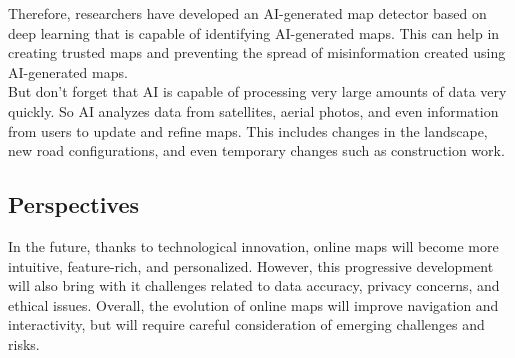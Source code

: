 \documentclass[10pt,oneside,english,a4paper]{article}
\begin{document}
Therefore, researchers have developed an AI-generated map detector based on deep learning that is capable of identifying AI-generated maps. This can help in creating trusted maps and preventing the spread of misinformation created using AI-generated maps.
\\But don't forget that AI is capable of processing very large amounts of data very quickly. So AI analyzes data from satellites, aerial photos, and even information from users to update and refine maps. This includes changes in the landscape, new road configurations, and even temporary changes such as construction work.

\subsection{Perspectives} \label{future:perspectives}
In the future, thanks to technological innovation, online maps will become more intuitive, feature-rich, and personalized. However, this progressive development will also bring with it challenges related to data accuracy, privacy concerns, and ethical issues. Overall, the evolution of online maps will improve navigation and interactivity, but will require careful consideration of emerging challenges and risks.
\end{document}
